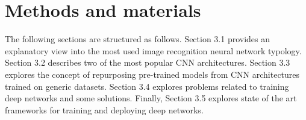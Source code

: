\documentclass[journal,compsoc]{IEEEtran}
\begin{document}


\section{Methods and materials}
The following sections are structured as follows. Section 3.1 provides an explanatory view into the most used image recognition neural network typology. Section 3.2 describes two of the most popular CNN architectures. Section 3.3 explores the concept of repurposing pre-trained models from CNN architectures trained on generic datasets. Section 3.4 explores problems related to training deep networks and some solutions. Finally, Section 3.5 explores state of the art frameworks for training and deploying deep networks.   
\end{document}
